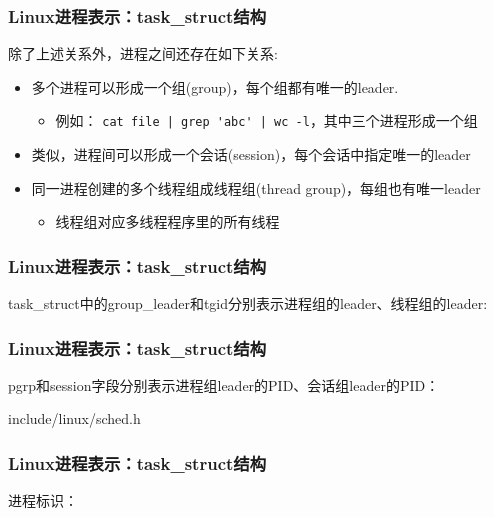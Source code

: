 \documentclass[xcolor=svgnames]{beamer}
\begin{document}
\begin{CJK*}{UTF8}{gbsn}
\begin{frame}[fragile]
\frametitle{Linux进程表示：task\_struct结构}
除了上述关系外，进程之间还存在如下关系:
\begin{itemize}
\item 多个进程可以形成一个组(group)，每个组都有唯一的leader.
\begin{itemize}
\item 例如： \verb=cat file | grep 'abc' | wc -l=，其中三个进程形成一个组
\end{itemize}
\item 类似，进程间可以形成一个会话(session)，每个会话中指定唯一的leader
\item 同一进程创建的多个线程组成线程组(thread group)，每组也有唯一leader
\begin{itemize}
\item 线程组对应多线程程序里的所有线程
\end{itemize}
\end{itemize}
\end{frame}

\begin{frame}[fragile]
\frametitle{Linux进程表示：task\_struct结构}
task\_struct中的group\_leader和tgid分别表示进程组的leader、线程组的leader:

\lstotherrelations
\end{frame}

\begin{frame}[fragile]
\frametitle{Linux进程表示：task\_struct结构}
pgrp和session字段分别表示进程组leader的PID、会话组leader的PID：
\begin{block}{include/linux/sched.h}
\lstsignalstruct
\end{block}
\end{frame}

\begin{frame}[fragile]
\frametitle{Linux进程表示：task\_struct结构}
进程标识：


\end{frame}
\end{CJK*}
\end{document}

